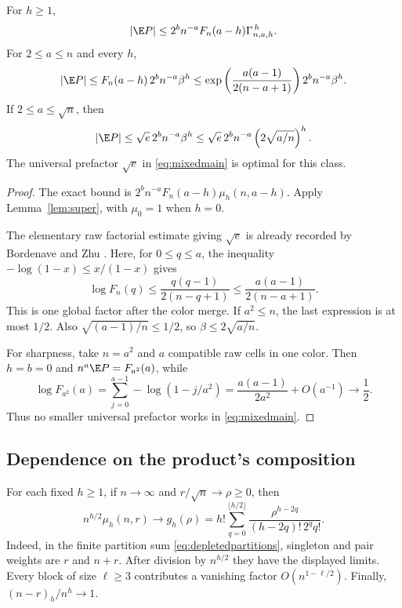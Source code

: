 \begin{corollary}\label{cor:mixedscalar}
For $h\ge1$,
\begin{equation}\label{eq:mixedgamma}
|\E P|\le 2^b n^{-a}F_n(a-h)\Gamma_{n,a,h}^{\,h}.
\end{equation}
For $2\le a\le n$ and every $h$,
\begin{equation}\label{eq:mixedgeneral}
|\E P|\le F_n(a-h)\,2^b n^{-a}\beta^h
\le\exp\left(\frac{a(a-1)}{2(n-a+1)}\right)2^bn^{-a}\beta^h.
\end{equation}
If $2\le a\le\sqrt n$, then
\begin{equation}\label{eq:mixedmain}
|\E P|\le\sqrt e\,2^b n^{-a}\beta^h
\le\sqrt e\,2^b n^{-a}\left(2\sqrt{a/n}\right)^h.
\end{equation}
The universal prefactor $\sqrt e$ in \eqref{eq:mixedmain} is optimal for this class.
\end{corollary}
\begin{proof}
The exact bound is $2^bn^{-a}F_n(a-h)\mu_h(n,a-h)$. Apply Lemma~\ref{lem:super}, with $\mu_0=1$ when $h=0$.

The elementary raw factorial estimate giving $\sqrt e$ is already recorded by Bordenave and Zhu \cite[Lemma 2.1, equation (2.3)]{BZ}. Here, for $0\le q\le a$, the inequality $-\log(1-x)\le x/(1-x)$ gives
\[
\log F_n(q)\le\frac{q(q-1)}{2(n-q+1)}
\le\frac{a(a-1)}{2(n-a+1)}.
\]
This is one global factor after the color merge. If $a^2\le n$, the last expression is at most $1/2$. Also $\sqrt{(a-1)/n}\le1/2$, so $\beta\le2\sqrt{a/n}$.

For sharpness, take $n=a^2$ and $a$ compatible raw cells in one color. Then $h=b=0$ and $n^a\E P=F_{a^2}(a)$, while
\[
\log F_{a^2}(a)=
\sum_{j=0}^{a-1}-\log(1-j/a^2)
=\frac{a(a-1)}{2a^2}+O(a^{-1})\longrightarrow\frac12.
\]
Thus no smaller universal prefactor works in \eqref{eq:mixedmain}.
\end{proof}

\subsection{Dependence on the product's composition}

For each fixed $h\ge1$, if $n\to\infty$ and $r/\sqrt n\to\rho\ge0$, then
\begin{equation}\label{eq:mixedfixedh}
n^{h/2}\mu_h(n,r)\longrightarrow
g_h(\rho)=h!\sum_{q=0}^{\lfloor h/2\rfloor}
\frac{\rho^{h-2q}}{(h-2q)!\,2^q q!}.
\end{equation}
Indeed, in the finite partition sum \eqref{eq:depletedpartitions}, singleton and pair weights are $r$ and $n+r$. After division by $n^{h/2}$ they have the displayed limits. Every block of size $\ell\ge3$ contributes a vanishing factor $O(n^{1-\ell/2})$. Finally, $(n-r)_h/n^h\to1$.

